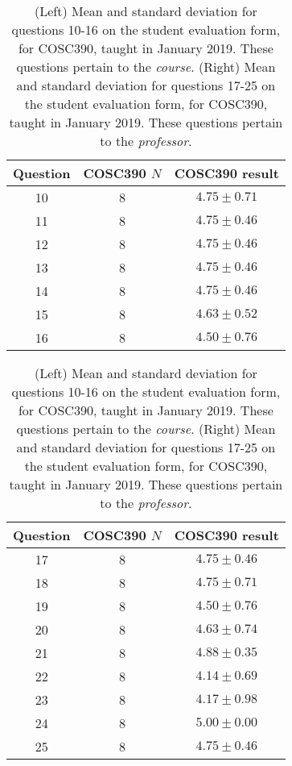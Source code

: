 \documentclass[../../main.tex]{subfiles}
\begin{document}
\label{sec:oof2}

\begin{table}
\small
\centering
\begin{tabular}{| c | c | c |}
\hline \hline
Question & COSC390 $N$ & COSC390 result \\ \hline
10 & 8 & $4.75\pm 0.71$ \\ \hline
11 & 8 & $4.75\pm 0.46$ \\ \hline
12 & 8 & $4.75\pm 0.46$ \\ \hline
13 & 8 & $4.75\pm 0.46$ \\ \hline
14 & 8 & $4.75\pm 0.46$ \\ \hline
15 & 8 & $4.63\pm 0.52$ \\ \hline
16 & 8 & $4.50\pm 0.76$ \\ \hline
\hline
\end{tabular}
\quad
\begin{tabular}{| c | c | c |}
\hline \hline
Question & COSC390 $N$ & COSC390 result \\ \hline
17 & 8 & $4.75\pm 0.46$ \\ \hline
18 & 8 & $4.75\pm 0.71$ \\ \hline
19 & 8 & $4.50\pm 0.76$ \\ \hline
20 & 8 & $4.63\pm 0.74$ \\ \hline
21 & 8 & $4.88\pm 0.35$ \\ \hline
22 & 8 & $4.14\pm 0.69$ \\ \hline
23 & 8 & $4.17\pm 0.98$ \\ \hline
24 & 8 & $5.00\pm 0.00$ \\ \hline
25 & 8 & $4.75\pm 0.46$ \\ \hline
\hline
\end{tabular}
\caption{\label{tab:courses:intro_eval_3} (Left) Mean and standard deviation for questions 10-16 on the student evaluation form, for COSC390, taught in January 2019.  These questions pertain to the \textit{course}.  (Right) Mean and standard deviation for questions 17-25 on the student evaluation form, for COSC390, taught in January 2019.  These questions pertain to the \textit{professor}.}
\end{table}
\end{document}
